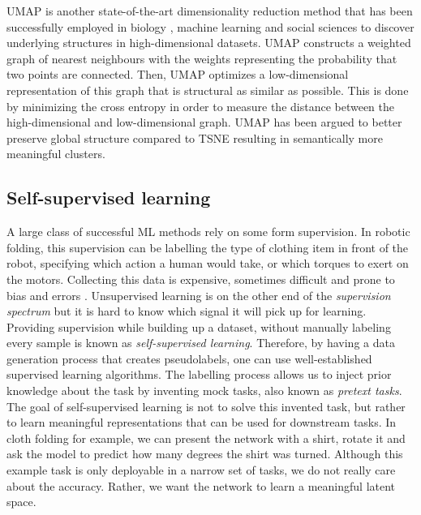 \documentclass[\home/main.tex]{subfiles}
\begin{document}
\Gls{UMAP} is another state-of-the-art dimensionality reduction method that has been successfully employed in biology \autocite{cao2019single}, machine learning \autocite{carter2019activation} and social sciences \autocite{diaz2019umap} to discover underlying structures in high-dimensional datasets. \Gls{UMAP} constructs a weighted graph of nearest neighbours with the weights representing the probability that two points are connected. Then, UMAP optimizes a low-dimensional representation of this graph that is structural as similar as possible. This is done by minimizing the cross entropy in order to measure the distance between the high-dimensional and low-dimensional graph. \gls{UMAP} has been argued to better preserve global structure compared to \gls{TSNE} \autocite{becht2019dimensionality} resulting in semantically more meaningful clusters. 

\subsection{Self-supervised learning} \label{subsec:lit_ssl}
A large class of successful \gls{ML} methods rely on some form supervision. In robotic folding, this supervision can be labelling the type of clothing item in front of the robot, specifying which action a human would take, or which torques to exert on the motors. Collecting this data is expensive, sometimes difficult and prone to bias and errors \autocite{mehrabi2021survey}. Unsupervised learning is on the other end of the \textit{supervision spectrum} but it is hard to know which signal it will pick up for learning. Providing supervision while building up a dataset, without manually labeling every sample is known as \emph{self-supervised learning}. Therefore, by having a data generation process that creates pseudolabels, one can use well-established supervised learning algorithms. The labelling process allows us to inject prior knowledge about the task by inventing mock tasks, also known as \emph{pretext tasks}. The goal of self-supervised learning is not to solve this invented task, but rather to learn meaningful representations that can be used for downstream tasks. In cloth folding for example, we can present the network with a shirt, rotate it and ask the model to predict how many degrees the shirt was turned. Although this example task is only deployable in a narrow set of tasks, we do not really care about the accuracy. Rather, we want the network to learn a meaningful latent space.
\end{document}

